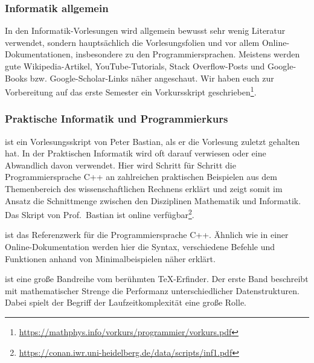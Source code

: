 \subsubsection{Informatik allgemein}
In den Informatik-Vorlesungen wird allgemein bewusst sehr wenig Literatur verwendet, sondern hauptsächlich die Vorlesungsfolien und vor allem Online-Dokumentationen, insbesondere zu den Programmiersprachen. Meistens werden gute Wikipedia-Artikel, YouTube-Tutorials, Stack Overflow-Posts und Google-Books bzw. Google-Scholar-Links näher angeschaut. Wir haben euch zur Vorbereitung auf das erste Semester ein Vorkursskript geschrieben\footnote{\url{https://mathphys.info/vorkurs/programmier/vorkurs.pdf}}.



\subsubsection{Praktische Informatik und Programmierkurs}
\begin{description}[style=unboxed]
\item[Bastian: Einführung in die praktische Informatik]{
	ist ein Vorlesungsskript von Peter Bastian, als er die Vorlesung zuletzt gehalten hat. In der Praktischen Informatik wird oft darauf verwiesen oder eine Abwandlich davon verwendet. Hier wird Schritt für Schritt die Programmiersprache C++ an zahlreichen praktischen Beispielen aus dem Themenbereich des wissenschaftlichen Rechnens erklärt und zeigt somit im Ansatz die Schnittmenge zwischen den Disziplinen Mathematik und Informatik. Das Skript von Prof.~Bastian ist online verfügbar\footnote{\url{https://conan.iwr.uni-heidelberg.de/data/scripts/inf1.pdf}}.}

\item[Stroustroup: The C++ Programming Language]{
	ist das Referenzwerk für die Programmiersprache C++. Ähnlich wie in einer Online-Dokumentation werden hier die Syntax, verschiedene Befehle und Funktionen anhand von Minimalbeispielen näher erklärt.}

\item[Knuth: The Art of Computer Programming]{ist eine große Bandreihe vom berühmten \TeX-Erfinder. Der erste Band beschreibt mit mathematischer Strenge die Performanz unterschiedlicher Datenstrukturen. Dabei spielt der Begriff der Laufzeitkomplexität eine große Rolle.}

\end{description}

